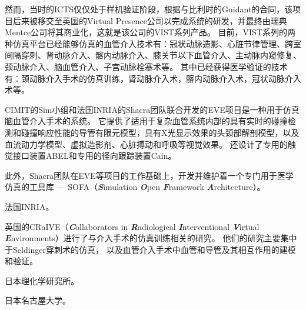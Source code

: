 然而，当时的ICTS仅仅处于样机验证阶段，根据与比利时的Guidant的合同，该项目后来被移交至英国的Virtual Presence公司以完成系统的研发，并最终由瑞典Mentce公司\cite{menticeweb}将其商业化\cite{GuidantMenticeNewsWeb}\cite{coles2011surveyCRaIVE}，这就是该公司的VIST系列产品。
目前，VIST系列的两种仿真平台已经能够仿真的血管介入技术有：冠状动脉造影、心脏节律管理、跨室间隔穿刺、肾动脉介入、髂内动脉介入、膝关节以下血管介入、主动脉内窥修复、颈动脉介入、脑血管介入、子宫动脉栓塞术等\cite{menticeweb}。
其中已经获得医学验证的技术有：颈动脉介入手术的仿真训练\cite{Dayal2004VIST}\cite{Hsu2004VIST}\cite{Nicholson2006VIST}\cite{Patel2006VIST}\cite{Cates2007VIST}\cite{VanHerzeele2009VIST}，肾动脉介入术\cite{Aggarwal2006}\cite{Glaiberman2008VIST}，髂内动脉介入术\cite{Chaer2006VIST}\cite{Berry2007VIST}\cite{VanHerzeele2008VIST}，冠状动脉介入术\cite{Gallagher2006VIST}等。

CIMIT的Sim小组\cite{medicalsimweb}和法国INRIA的Shacra团队\cite{shacraweb}联合开发的EVE项目\cite{Wu2005EVE}\cite{dequidt2007}是一种用于仿真脑血管介入手术的系统。
它提供了适用于复杂血管系统内部的具有实时的碰撞检测和碰撞响应性能的导管有限元模型\cite{Duriez2006EVE}\cite{Lenoir2006EVE}\cite{Lenoir2005EVE}\cite{Cotin2005EVE}，具有X光显示效果的头颈部解剖模型\cite{Wu2011MedicalSim}\cite{Luboz2005EVE}\cite{Muniyandi2003EVE}，以及血流动力学模型、虚拟造影剂、心脏搏动和呼吸\cite{Wu2007EVE}等视觉效果。
还设计了专用的触觉接口装置ABEL和专用的径向跟踪装置Cain\cite{medicalsimweb}。

此外，Shacra团队在EVE等项目的工作基础上，开发并维护着一个专门用于医学仿真的工具库 --- SOFA（\textbf{\textit{S}}imulation \textbf{\textit{O}}pen \textbf{\textit{F}}ramework \textbf{\textit{A}}rchitecture）\cite{Allard2007SOFA}。

法国INRIA\cite{Dequidt2008INRIA}。

英国的CRaIVE（\textbf{\textit{C}}ollaborators in \textbf{\textit{R}}adiological \textbf{\textit{I}}nterventional \textbf{\textit{V}}irtual \textbf{\textit{E}}nvironments）\cite{CRaIVEweb}进行了与介入手术的仿真训练相关的研究。
他们的研究主要集中于Seldinger穿刺术的仿真\cite{Coles2011CRaIVE}\cite{Coles2010CRaIVE}\cite{Coles2009CRaIVE}\cite{John2008CRaIVE}，
以及血管介入手术中血管和导管及其相互作用的建模和验证\cite{Luboz2010CRaIVE}\cite{luboz2009CRaIVE}\cite{Luboz2009aCRaIVE}\cite{Luboz2008aCRaIVE}\cite{Luboz2008CRaIVE}。

日本理化学研究所\cite{takashima2009RIKEN}\cite{takashima2007RIKEN}。

日本名古屋大学\cite{Arai1996Nagoya}\cite{Ikeda2005Nagoya}。

